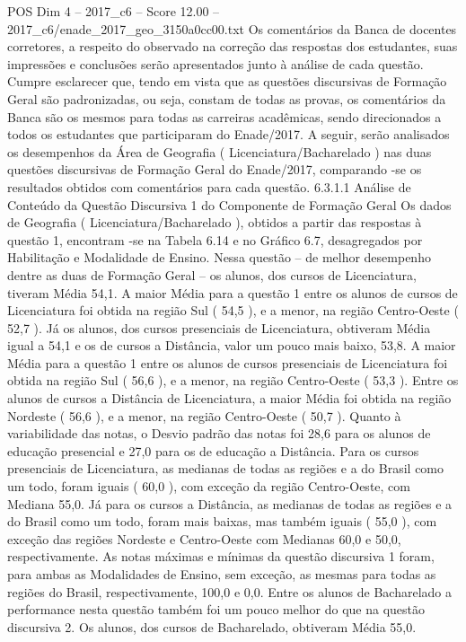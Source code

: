 \begin{textsample}{POS Dim 4 – 2017\_c6 – Score 12.00 – 2017\_c6/enade\_2017\_geo\_3150a0cc00.txt}
Os comentários da Banca de docentes corretores, a respeito do observado na correção das respostas dos estudantes, suas impressões e conclusões serão apresentados junto à análise de cada questão.
Cumpre esclarecer que, tendo em vista que as questões discursivas de Formação Geral são padronizadas, ou seja, constam de todas as provas, os comentários da Banca são os mesmos para todas as carreiras acadêmicas, sendo direcionados a todos os estudantes que participaram do Enade/2017.
A seguir, serão analisados os desempenhos da Área de Geografia ( Licenciatura/Bacharelado ) nas duas questões discursivas de Formação Geral do Enade/2017, comparando -se os resultados obtidos com comentários para cada questão. 6.3.1.1 Análise de Conteúdo da Questão Discursiva 1 do Componente de Formação Geral Os dados de Geografia ( Licenciatura/Bacharelado ), obtidos a partir das respostas à questão 1, encontram -se na Tabela 6.14 e no Gráfico 6.7, desagregados por Habilitação e Modalidade de Ensino.
Nessa questão – de melhor desempenho dentre as duas de Formação Geral – os alunos, dos cursos de Licenciatura, tiveram Média 54,1.
A maior Média para a questão 1 entre os alunos de cursos de Licenciatura foi obtida na região Sul ( 54,5 ), e a menor, na região Centro-Oeste ( 52,7 ).
Já os alunos, dos cursos presenciais de Licenciatura, obtiveram Média igual a 54,1 e os de cursos a Distância, valor um pouco mais baixo, 53,8.
A maior Média para a questão 1 entre os alunos de cursos presenciais de Licenciatura foi obtida na região Sul ( 56,6 ), e a menor, na região Centro-Oeste ( 53,3 ).
Entre os alunos de cursos a Distância de Licenciatura, a maior Média foi obtida na região Nordeste ( 56,6 ), e a menor, na região Centro-Oeste ( 50,7 ).
Quanto à variabilidade das notas, o Desvio padrão das notas foi 28,6 para os alunos de educação presencial e 27,0 para os de educação a Distância.
Para os cursos presenciais de Licenciatura, as medianas de todas as regiões e a do Brasil como um todo, foram iguais ( 60,0 ), com exceção da região Centro-Oeste, com Mediana 55,0.
Já para os cursos a Distância, as medianas de todas as regiões e a do Brasil como um todo, foram mais baixas, mas também iguais ( 55,0 ), com exceção das regiões Nordeste e Centro-Oeste com Medianas 60,0 e 50,0, respectivamente.
As notas máximas e mínimas da questão discursiva 1 foram, para ambas as Modalidades de Ensino, sem exceção, as mesmas para todas as regiões do Brasil, respectivamente, 100,0 e 0,0.
Entre os alunos de Bacharelado a performance nesta questão também foi um pouco melhor do que na questão discursiva 2.
Os alunos, dos cursos de Bacharelado, obtiveram Média 55,0.

\end{textsample}
